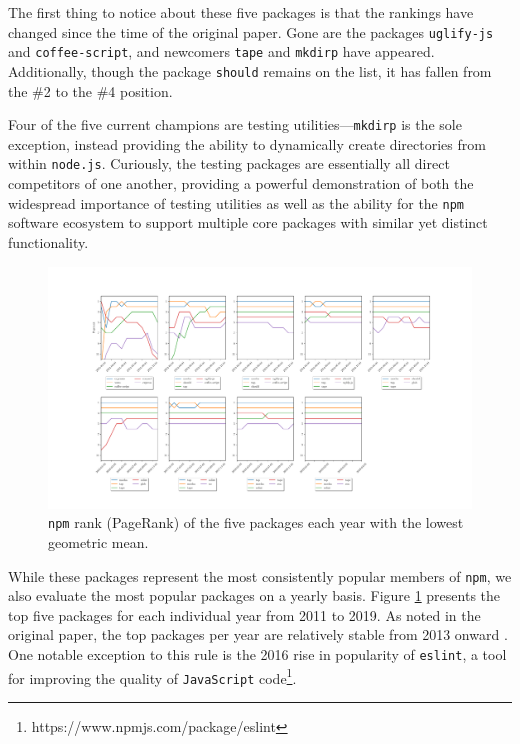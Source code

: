\documentclass[10pt,conference]{IEEEtran}
\def\code#1{\texttt{#1}}
\begin{document}
The first thing to notice about these five packages is that the rankings
have changed since the time of the original paper. Gone are the packages
\code{uglify-js} and \code{coffee-script}, and newcomers \code{tape} and \code{mkdirp}
have appeared. Additionally, though the package \code{should} remains on the list,
it has fallen from the \#2 to the \#4 position. 

Four of the five current champions are testing utilities---\code{mkdirp} is the sole exception, instead providing the ability to dynamically
create directories from within \code{node.js}. Curiously, the testing packages
are essentially all direct competitors of one another, providing a powerful 
demonstration of both the widespread importance of testing utilities as well as
the ability for the \code{npm} software ecosystem to support multiple core packages with
similar yet distinct functionality.

\begin{figure}
  \includegraphics[width=1\textwidth]{figures/highest_ranked.pdf}
  \caption{\code{npm} rank (PageRank) of the five packages each year with the lowest geometric mean.}
  \label{ranksByYear}
\end{figure}

While these packages represent the most consistently popular
members of \code{npm}, we also evaluate the most popular packages
on a yearly basis. Figure \ref{ranksByYear} presents the top five packages
for each individual year from 2011 to 2019. As noted in the original paper,
the top packages per year are relatively stable from 2013 onward \cite{Wittern:2016}.
One notable exception to this rule is the 2016 rise in popularity of \code{eslint},
a tool for improving the quality of \code{JavaScript} code\footnote{https://www.npmjs.com/package/eslint}.
\end{document}
